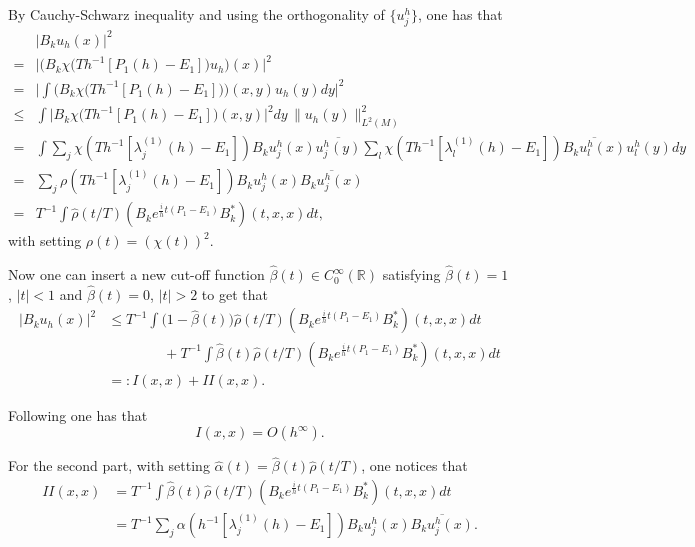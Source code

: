 \documentclass[12pt,reqno]{amsart}
\numberwithin{equation}{section}
\begin{document}
By Cauchy-Schwarz inequality and using the orthogonality of $\{u_j^h\}$, one has that
\begin{align}
&\Big| B_k u_h (x) \Big|^2 \nonumber \\
=&\Big| \big(B_k \chi \big(T h^{-1}[P_1(h)-E_1]\big) u_h\big) (x) \Big|^2 \nonumber\\
=&  \Big| \int \Big(B_k\chi\big(T h^{-1}[P_1(h)-E_1]\big)\Big) (x,y) u_h(y) dy  \Big|^2  \nonumber \\
\leq &  \int \Big| B_k\chi\big(Th^{-1}[P_1(h)-E_1]\big) (x,y) \Big|^2 dy \, \|u_h(y)\|^2_{L^2(M)} \nonumber\\
=& \int \sum_j \chi(Th^{-1}[\lambda_j^{(1)}(h)-E_1]) B_ku_j^h(x) \overline{u_j^h(y)} \sum_l \chi(Th^{-1}[\lambda_l^{(1)}(h)-E_1]) \overline{B_k u_l^h(x)} u_l^h(y) dy \nonumber\\
=& \sum_j \rho(Th^{-1}[\lambda_j^{(1)}(h)-E_1]) B_k u_j^h(x) \overline{B_k u_j^h(x)} \nonumber\\
=& T^{-1} \int \hat\rho(t/T) (B_k e^{\frac{i}h t(P_1-E_1)} B_k^*)(t,x,x) dt,
\end{align}
with setting $\rho(t)=(\chi(t))^2$.


Now one can insert a new cut-off function $\hat\beta(t)\in C_0^\infty(\mathbb{R})$ satisfying $\hat\beta(t)=1$, $|t|<1$ and $\hat\beta(t)=0$, $|t|>2$ to get that
\begin{align}
\Big| B_k u_h (x) \Big|^2 &\leq  T^{-1} \int \big(1-\hat\beta(t)\big)\hat\rho(t/T) (B_k e^{\frac{i}h t(P_1-E_1)}B_k^*)(t,x,x) dt \nonumber\\
&\qquad\qquad + T^{-1} \int \hat\beta(t)\hat\rho(t/T) (B_k e^{\frac{i}h t(P_1-E_1)}B_k^*)(t,x,x) dt \nonumber\\
&=:I(x,x)+II(x,x).
\end{align}

Following \cite{STZ11} one has that
\begin{equation}\label{BI}
I(x,x) =O(h^\infty).
\end{equation}


For the second part, with setting $\hat\alpha(t)=\hat\beta(t)\hat\rho(t/T)$, one notices that
\begin{align*}
II(x,x)&=T^{-1} \int \hat\beta(t)\hat\rho(t/T) (B_ke^{\frac{i}h t(P_1-E_1)} B_k^*)(t,x,x) dt \\
&=T^{-1} \sum_j \alpha(h^{-1}[\lambda_j^{(1)}(h)-E_1]) B_k u_j^h(x) \overline{B_k u_j^h(x)}.
\end{align*}
\end{document}
